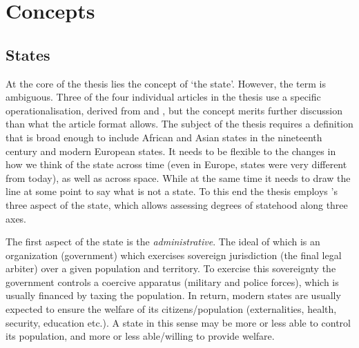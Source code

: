 \documentclass[12pt]{article}
\begin{document}


\section{Concepts} \label{Concepts}

\subsection{States} \label{States}

At the core of the thesis lies the concept of `the state'. However, the term is
ambiguous. Three of the four individual articles in the thesis use a specific
operationalisation, derived from \citet{Butcher2019} and \citet{Butcher2017},
but the concept merits further discussion than what the article format allows.
The subject of the thesis requires a definition that is broad enough to include
African and Asian states in the nineteenth century and modern European states.
It needs to be flexible to the changes in how we think of the state across time
(even in Europe, states were very different from today), as well as across
space. While at the same time it needs to draw the line at some point to say
what is not a state. To this end the thesis employs \citet{Clapham1996}'s three
aspect of the state, which allows assessing degrees of statehood along three
axes.

The first aspect of the state is the \textit{administrative}. The ideal of
which is an organization (government) which exercises sovereign jurisdiction
(the final legal arbiter) over a given population and territory. To exercise
this sovereignty the government controls a coercive apparatus (military and
police forces), which is usually financed by taxing the population. In return,
modern states are usually expected to ensure the welfare of its
citizens/population (externalities, health, security, education etc.). A state
in this sense may be more or less able to control its population, and more or
less able/willing to provide welfare.
\end{document}
